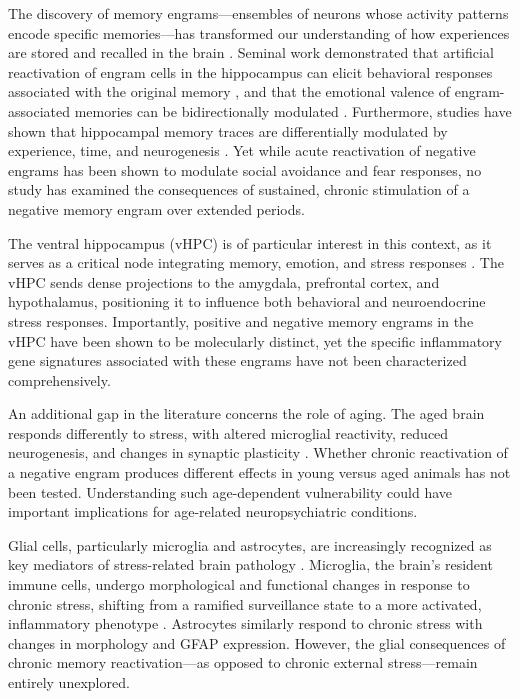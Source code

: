 \documentclass[11pt]{article}
\begin{document}
The discovery of memory engrams---ensembles of neurons whose activity patterns encode specific memories---has transformed our understanding of how experiences are stored and recalled in the brain \citep{josselyn2015memory}. Seminal work demonstrated that artificial reactivation of engram cells in the hippocampus can elicit behavioral responses associated with the original memory \citep{ramirez2013creating}, and that the emotional valence of engram-associated memories can be bidirectionally modulated \citep{redondo2014bidirectional}. Furthermore, studies have shown that hippocampal memory traces are differentially modulated by experience, time, and neurogenesis \citep{denny2014hippocampal}. Yet while acute reactivation of negative engrams has been shown to modulate social avoidance and fear responses, no study has examined the consequences of sustained, chronic stimulation of a negative memory engram over extended periods.

The ventral hippocampus (vHPC) is of particular interest in this context, as it serves as a critical node integrating memory, emotion, and stress responses \citep{fanselow2000contextual}. The vHPC sends dense projections to the amygdala, prefrontal cortex, and hypothalamus, positioning it to influence both behavioral and neuroendocrine stress responses. Importantly, positive and negative memory engrams in the vHPC have been shown to be molecularly distinct, yet the specific inflammatory gene signatures associated with these engrams have not been characterized comprehensively.

An additional gap in the literature concerns the role of aging. The aged brain responds differently to stress, with altered microglial reactivity, reduced neurogenesis, and changes in synaptic plasticity \citep{roth2009lasting}. Whether chronic reactivation of a negative engram produces different effects in young versus aged animals has not been tested. Understanding such age-dependent vulnerability could have important implications for age-related neuropsychiatric conditions.

Glial cells, particularly microglia and astrocytes, are increasingly recognized as key mediators of stress-related brain pathology \citep{nimmerjahn2005resting, wohleb2016neuron}. Microglia, the brain's resident immune cells, undergo morphological and functional changes in response to chronic stress, shifting from a ramified surveillance state to a more activated, inflammatory phenotype \citep{york2021microglial}. Astrocytes similarly respond to chronic stress with changes in morphology and GFAP expression. However, the glial consequences of chronic memory reactivation---as opposed to chronic external stress---remain entirely unexplored.
\end{document}
